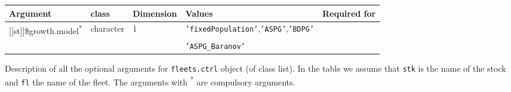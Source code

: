 \begin{landscape}
\begin{table}[!ht]
\begin{footnotesize}
\begin{threeparttable}
      \begin{tabular}{lllll} %
        \hline 
        Argument & class & Dimension & Values & Required for \\
        \hline
        {[[st]]}\$growth.model\textsuperscript{*} & character & 1 & \texttt{'fixedPopulation'},\texttt{'ASPG'},\texttt{'BDPG'} & \\
         &  &  & \texttt{'ASPG\_Baranov'} & \\
        \hline
      \end{tabular}
      
    \end{threeparttable}
  \end{footnotesize}

\end{table}


\begin{table}[!ht]

  \centering
  \begin{footnotesize}
    
    \caption{Description of all the optional arguments for \texttt{fleets.ctrl} object (of class list).
    In the table we assume that \texttt{stk} is the name of the stock and \texttt{fl} the name of the fleet.
    The arguments with \textsuperscript{*} are compulsory arguments.}
    
    \label{tb:A3.table3}
    
    \begin{threeparttable}
    

\end{threeparttable}
\end{footnotesize}
\end{table}
\end{landscape}
